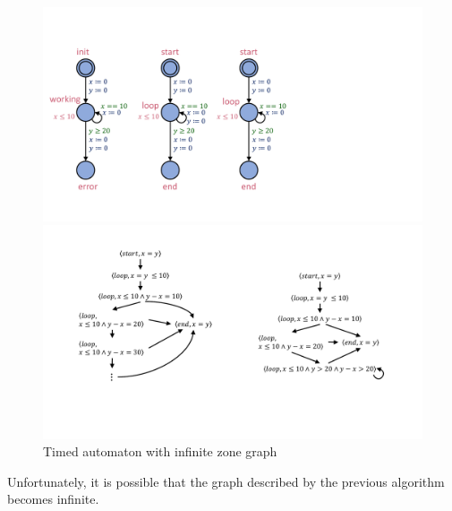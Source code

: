 \begin{figure}
	\centering
	\begin{minipage}[c] {0.25\linewidth}%
				\vspace*{1pt}%
		\includegraphics [width=\textwidth]{include/figures/loop_example_original}%
	\end{minipage}%
		\hspace{0.1\linewidth}%
	\begin{minipage}[c] {0.5\linewidth}%
		\includegraphics [width=\textwidth] {include/figures/loop_original_zonegraph}%
				\vspace*{4pt}%
	\end{minipage}
	\caption{Timed automaton with infinite zone graph}
	\label{fig:loopinfinite}
\end{figure} 

Unfortunately, it is possible that the graph described by the previous algorithm becomes infinite. 

